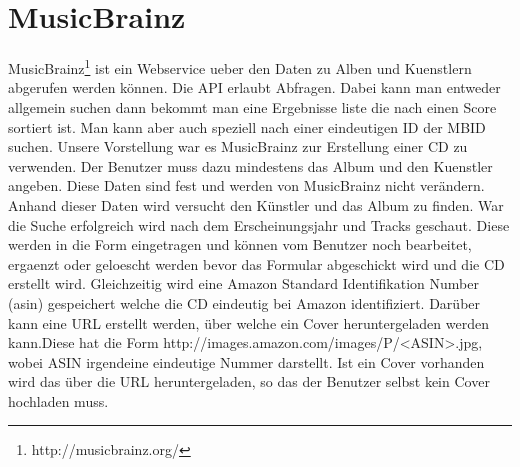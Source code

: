 \section{MusicBrainz}
\label{sec:MusicBrainz}

MusicBrainz\footnote{http://musicbrainz.org/} ist ein Webservice ueber den Daten zu Alben und Kuenstlern abgerufen werden können. Die API erlaubt Abfragen. Dabei kann man entweder allgemein suchen dann bekommt man eine Ergebnisse liste die nach einen Score sortiert ist. Man kann aber auch speziell nach einer eindeutigen ID der MBID suchen. Unsere Vorstellung war es MusicBrainz zur Erstellung einer CD zu verwenden. Der Benutzer muss dazu mindestens das Album und den Kuenstler angeben. Diese Daten sind fest und werden von MusicBrainz nicht verändern. Anhand dieser Daten wird versucht den Künstler und das Album zu finden. War die Suche erfolgreich wird nach dem Erscheinungsjahr und Tracks geschaut. Diese werden in die Form eingetragen und können vom Benutzer noch bearbeitet, ergaenzt oder geloescht werden bevor das Formular abgeschickt wird und die CD erstellt wird. Gleichzeitig wird eine Amazon Standard Identifikation Number (asin) gespeichert welche die CD eindeutig bei Amazon identifiziert. Darüber kann eine URL erstellt werden, über welche ein Cover heruntergeladen werden kann.Diese hat die Form http://images.amazon.com/images/P/<ASIN>.jpg, wobei ASIN irgendeine eindeutige Nummer darstellt. Ist ein Cover vorhanden wird das über die URL heruntergeladen, so das der Benutzer selbst kein Cover hochladen muss.
